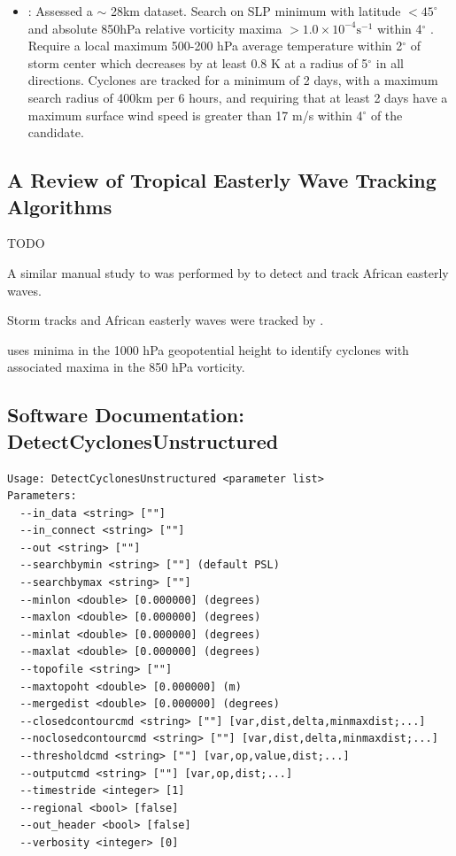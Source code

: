 \documentclass[gmdd, hvmath, online]{copernicus_discussions}
\begin{document}
\begin{itemize}
\item \cite{zarzycki2014multidecadal}:  Assessed a $\sim$ 28km dataset.  Search on SLP minimum with latitude $< 45^\circ$ and absolute 850hPa relative vorticity maxima $> 1.0 \times 10^{-4} \mbox{s}^{-1}$ within 4$^\circ$ .  Require a local maximum 500-200 hPa average temperature within 2$^\circ$ of storm center which decreases by at least 0.8 K at a radius of 5$^\circ$ in all directions.  Cyclones are tracked for a minimum of 2 days, with a maximum search radius of 400km per 6 hours, and requiring that at least 2 days have a maximum surface wind speed is greater than 17 m/s within 4$^\circ$ of the candidate.

\end{itemize}

\subsection{A Review of Tropical Easterly Wave Tracking Algorithms} \label{sec:TropicalEasterlyWaveAlgorithms}

{\color{red}TODO}

A similar manual study to \cite{akyildiz1985systematic} was performed by \cite{reed1988evaluation} to detect and track African easterly waves.

Storm tracks and African easterly waves were tracked by \cite{hodges2003comparison}.

\cite{konig1993objective} uses minima in the 1000 hPa geopotential height to identify cyclones with associated maxima in the 850 hPa vorticity.


\subsection{Software Documentation: DetectCyclonesUnstructured} \label{sec:DetectCyclonesUnstructuredAppendix}

\begin{verbatim}
Usage: DetectCyclonesUnstructured <parameter list>
Parameters:
  --in_data <string> [""] 
  --in_connect <string> [""] 
  --out <string> [""] 
  --searchbymin <string> [""] (default PSL)
  --searchbymax <string> [""] 
  --minlon <double> [0.000000] (degrees)
  --maxlon <double> [0.000000] (degrees)
  --minlat <double> [0.000000] (degrees)
  --maxlat <double> [0.000000] (degrees)
  --topofile <string> [""] 
  --maxtopoht <double> [0.000000] (m)
  --mergedist <double> [0.000000] (degrees)
  --closedcontourcmd <string> [""] [var,dist,delta,minmaxdist;...]
  --noclosedcontourcmd <string> [""] [var,dist,delta,minmaxdist;...]
  --thresholdcmd <string> [""] [var,op,value,dist;...]
  --outputcmd <string> [""] [var,op,dist;...]
  --timestride <integer> [1] 
  --regional <bool> [false] 
  --out_header <bool> [false] 
  --verbosity <integer> [0] 
\end{verbatim}
\end{document}
